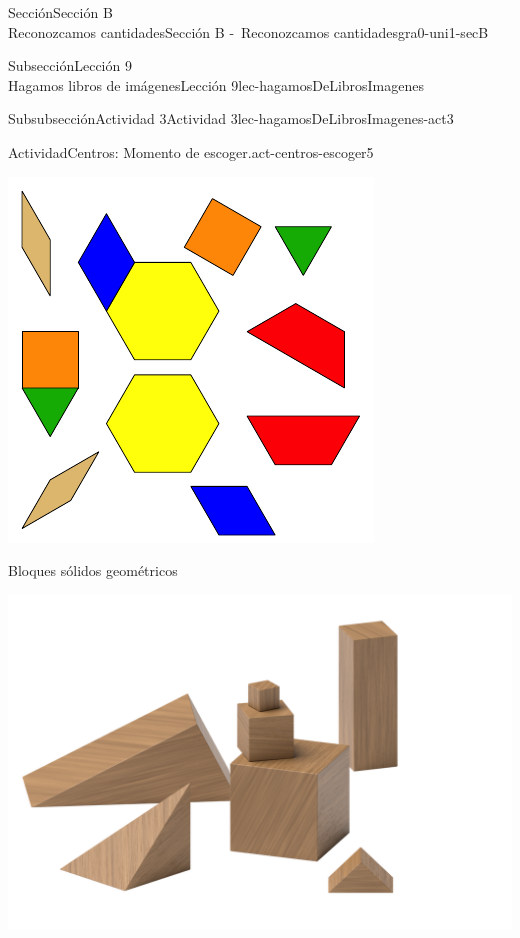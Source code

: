 \begin{sectionptx}{Sección}{{\Large Sección B\\}Reconozcamos cantidades}{}{Sección B -~Reconozcamos cantidades}{}{}{gra0-uni1-secB}
\begin{subsectionptx}{Subsección}{{\normalsize Lección 9\\[-0.05cm]}Hagamos libros de imágenes}{}{Lección 9}{}{}{lec-hagamosDeLibrosImagenes}
\begin{subsubsectionptx}{Subsubsección}{Actividad 3}{}{Actividad 3}{}{}{lec-hagamosDeLibrosImagenes-act3}
\begin{activity}{Actividad}{Centros: Momento de escoger.}{act-centros-escoger5}
\begin{sidebyside}{2}{0.025}{0.025}{0.05}
\begin{sbspanel}{0.45}
\includegraphics[max width=\linewidth, center]{external/svg-source/tikz-file-147344.pdf}
\end{sbspanel}%
\end{sidebyside}%
\begin{sidebyside}{2}{0.025}{0.025}{0.05}%
\begin{sbspanel}{0.45}%
Bloques sólidos geométricos%
\par
\includegraphics[max width=\linewidth, center]{external/png-source/K.1.A Beta Student Workbook.Geoblocks.png}
\end{sbspanel}%

\end{sidebyside}
\end{activity}
\end{subsubsectionptx}
\end{subsectionptx}
\end{sectionptx}
